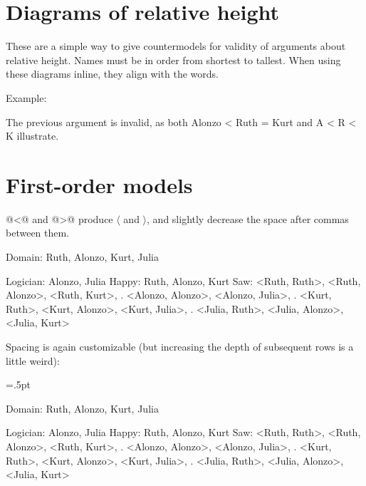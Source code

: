 \section{Diagrams of relative height}

\unorderedlist
\li These are a simple way to give countermodels for validity of arguments about relative height.
\li Names must be in order from shortest to tallest.
\li When using these diagrams inline, they align with the words.
\endunorderedlist

\noindent Example:

\noindent The previous argument is invalid, as both\quad
\heightmodel
 Alonzo < Ruth = Kurt
\endheightmodel
\quad and\quad
\heightmodelinitialbarheight=8pt%
\heightmodelbaradvance=4pt%
\heightmodelbarwidth=4pt%
\heightmodelspace=4pt%
\heightmodel
 A < R < K
\endheightmodel
\quad illustrate.

\pagebreak

\section{First-order models}

@<@ and @>@ produce $\langle$ and $\rangle$, and slightly decrease the space after commas between them.

\firstordermodel 
Domain:    Ruth, Alonzo, Kurt, Julia

Logician:  Alonzo, Julia
Happy:     Ruth, Alonzo, Kurt
Saw:       <Ruth, Ruth>, <Ruth, Alonzo>, <Ruth, Kurt>,
   .       <Alonzo, Alonzo>, <Alonzo, Julia>,
   .       <Kurt, Ruth>, <Kurt, Alonzo>, <Kurt, Julia>,
   .       <Julia, Ruth>, <Julia, Alonzo>, <Julia, Kurt>
\endfirstordermodel

\noindent Spacing is again customizable (but increasing the depth of subsequent rows is a little weird):

\fomodelfirstrowheight=18.5pt \fomodelfirstrowdepth=5.5pt%
\fomodelrowheight=13pt        \fomodelrowdepth=3.5pt%
\fomodelpadding=.5pt%
\fomodelspace=20pt%

\firstordermodel 
Domain:    Ruth, Alonzo, Kurt, Julia

Logician:  Alonzo, Julia
Happy:     Ruth, Alonzo, Kurt
Saw:       <Ruth, Ruth>, <Ruth, Alonzo>, <Ruth, Kurt>,
   .       <Alonzo, Alonzo>, <Alonzo, Julia>,
   .       <Kurt, Ruth>, <Kurt, Alonzo>, <Kurt, Julia>,
   .       <Julia, Ruth>, <Julia, Alonzo>, <Julia, Kurt>
\endfirstordermodel

\bye
